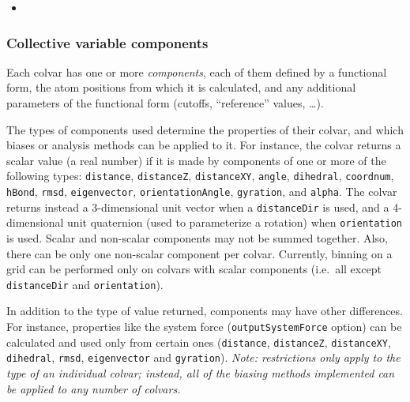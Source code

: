 \begin{itemize}
\item %

\end{itemize}



\subsubsection{Collective variable components}
\label{sec:cvc}

Each colvar has one or more \emph{components}, each of them defined by
a functional form, the atom positions from which it is calculated, and
any additional parameters of the functional form (cutoffs,
``reference'' values, \ldots).

The types of components used determine the properties of their colvar,
and which biases or analysis methods can be applied to it.  For
instance, the colvar returns a scalar value (a real number) if it is
made by components of one or more of the following types:
\texttt{distance}, \texttt{distanceZ}, \texttt{distanceXY},
\texttt{angle}, \texttt{dihedral}, \texttt{coordnum}, \texttt{hBond},
\texttt{rmsd}, \texttt{eigenvector}, \texttt{orientationAngle},
\texttt{gyration}, and \texttt{alpha}.  The colvar returns instead a
3-dimensional unit vector when a \texttt{distanceDir} is used, and a
4-dimensional unit quaternion (used to parameterize a rotation) when
\texttt{orientation} is used.  Scalar and non-scalar components may
not be summed together.  Also, there can be only one non-scalar
component per colvar.  Currently, binning on a grid can be performed
only on colvars with scalar components (i.e.~all except
\texttt{distanceDir} and \texttt{orientation}).

In addition to the type of value returned, components may have other
differences.  For instance, properties like the system force
(\texttt{outputSystemForce} option) can be calculated and used only
from certain ones (\texttt{distance}, \texttt{distanceZ},
\texttt{distanceXY}, \texttt{dihedral}, \texttt{rmsd},
\texttt{eigenvector} and \texttt{gyration}).  \emph{Note: restrictions
  only apply to the type of an individual colvar; instead, all of the
  biasing methods implemented can be applied to any number of
  colvars.}

